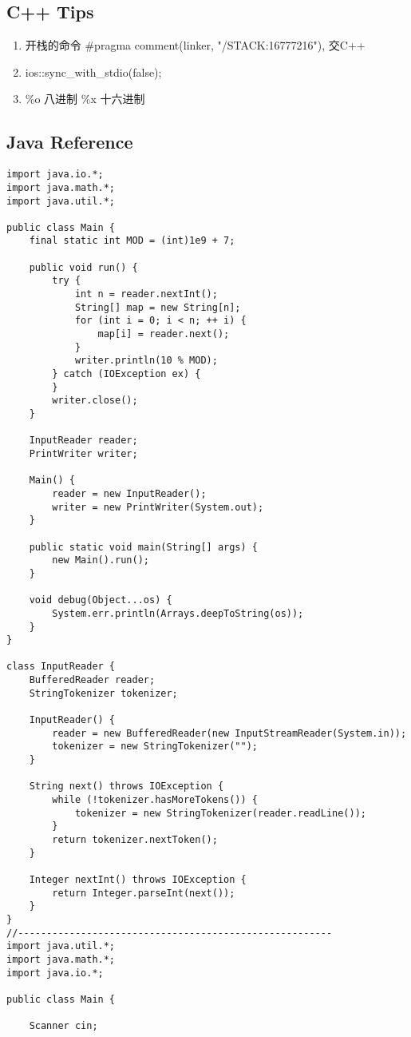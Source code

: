 \subsection{C++ Tips}
\begin{enumerate}
\item 开栈的命令 \#pragma comment(linker, "/STACK:16777216"), 交C++
\item ios::sync\_with\_stdio(false);
\item \%o 八进制 \%x 十六进制
\end{enumerate}

\subsection{Java Reference}
\lstset{language = Java}
\begin{lstlisting}
import java.io.*;
import java.math.*;
import java.util.*;

public class Main {
	final static int MOD = (int)1e9 + 7;

	public void run() {
		try {
			int n = reader.nextInt();
			String[] map = new String[n];
			for (int i = 0; i < n; ++ i) {
				map[i] = reader.next();
			}
			writer.println(10 % MOD);
		} catch (IOException ex) {
		}
		writer.close();
	}

	InputReader reader;
	PrintWriter writer;

	Main() {
		reader = new InputReader();
		writer = new PrintWriter(System.out);
	}

	public static void main(String[] args) {
		new Main().run();
	}

	void debug(Object...os) {
		System.err.println(Arrays.deepToString(os));
	}
}

class InputReader {
	BufferedReader reader;
	StringTokenizer tokenizer;

	InputReader() {
		reader = new BufferedReader(new InputStreamReader(System.in));
		tokenizer = new StringTokenizer("");
	}

	String next() throws IOException {
		while (!tokenizer.hasMoreTokens()) {
			tokenizer = new StringTokenizer(reader.readLine());
		}
		return tokenizer.nextToken();
	}

	Integer nextInt() throws IOException {
		return Integer.parseInt(next());
	}
}
//-------------------------------------------------------
import java.util.*;
import java.math.*;
import java.io.*;

public class Main {

	Scanner cin;


\end{lstlisting}
